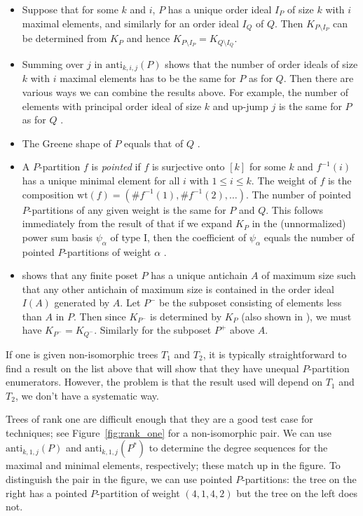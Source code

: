 \documentclass[ALCO,Unicode,published]{cedram}
\newcommand{\anti}{\mathrm{anti}}
\newcommand{\wt}{\mathrm{wt}}
\begin{document}
\begin{itemize}
\item Suppose that for some $k$ and $i$, $P$ has a unique order ideal $I_P$ of size $k$ with $i$ maximal elements, and similarly for an order ideal $I_Q$ of $Q$.  Then $K_{P\setminus I_P}$ can be determined from $K_P$ \cite[Corollary 3.6]{LiWe20} and hence $K_{P\setminus I_P} = K_{Q \setminus I_Q}$.

\item Summing over $j$ in $\anti_{k,i,j}(P)$ shows that the number of order ideals of size $k$ with $i$ maximal elements has to be the same for $P$ as for $Q$.  Then there are various ways we can combine the results above.  For example, the number of elements with principal order ideal of size $k$ and up-jump $j$ is the same for $P$ as for $Q$ \cite{LiWe20}.

\item The Greene shape of $P$ equals that of $Q$ \cite{LiWe20}.

\item A $P$-partition $f$ is \emph{pointed} if $f$ is surjective onto $[k]$ for some $k$ and $f^{-1}(i)$ has a unique minimal element for all $i$ with $1 \leq i \leq k$.  The weight of $f$ is the composition $\wt(f) = (\#f^{-1}(1), \#f^{-1}(2), \ldots)$.  The number of pointed $P$-partitions of any given weight is the same for $P$ and $Q$.  This follows immediately from the result of \cite{AlSu21} that if we expand $K_P$ in the (unnormalized) power sum basis $\psi_\alpha$ of type I, then the coefficient of $\psi_\alpha$ equals the number of pointed $P$-partitions of weight $\alpha$ .

\item \cite[Lemma~4.10]{LiWe20} shows that any finite poset $P$ has a unique antichain $A$ of maximum size such that any other antichain of maximum size is contained in the order ideal $I(A)$ generated by $A$.  Let $P^-$ be the subposet consisting of elements less than $A$ in $P$.  Then since $K_{P^-}$ is determined by $K_P$ (also shown in \cite{LiWe20}), we must have $K_{P^-} = K_{Q^-}$.  Similarly for the subposet $P^+$ above $A$.
\end{itemize}

If one is given non-isomorphic trees $T_1$ and $T_2$, it is typically straightforward to find a result on the list above that will show that they have unequal $P$-partition enumerators.  However, the problem is that the result used will depend on $T_1$ and $T_2$, \ie we don't have a systematic way.

Trees of rank one are difficult enough that they are a good test case for techniques; see Figure~\ref{fig:rank_one} for a non-isomorphic pair.  We can use $\anti_{k,1,j}(P)$ and $ \anti_{k,1,j}(P^*)$ to determine the degree sequences for the maximal and minimal elements, respectively; these match up in the figure.  To distinguish the pair in the figure, we can use pointed $P$-partitions: the tree on the right has a pointed $P$-partition of weight $(4,1,4,2)$ but the tree on the left does not.
\end{document}
